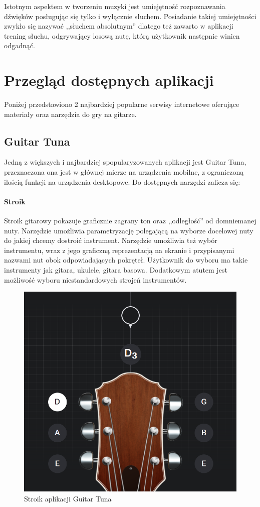Istotnym aspektem w tworzeniu muzyki jest umiejętność rozpoznawania dźwięków posługując się tylko i wyłącznie słuchem. Posiadanie takiej umiejętności zwykło się nazywać ,,słuchem absolutnym'' dlatego też zawarto w aplikacji trening słuchu, odgrywający losową nutę, którą użytkownik następnie winien odgadnąć.  

\section{Przegląd dostępnych aplikacji}
Poniżej przedstawiono 2 najbardziej popularne serwisy internetowe oferujące materiały oraz narzędzia do gry na gitarze. 

\subsection{Guitar Tuna}

Jedną z większych i najbardziej spopularyzowanych aplikacji jest Guitar Tuna, przeznaczona ona jest w głównej mierze na urządzenia mobilne, z ograniczoną ilością funkcji na urządzenia desktopowe. Do dostępnych narzędzi zalicza się:

\paragraph{Stroik}


Stroik gitarowy pokazuje graficznie zagrany ton oraz ,,odległość'' od domniemanej nuty. Narzędzie umożliwia parametryzację polegającą na wyborze docelowej nuty do jakiej chcemy dostroić instrument. Narzędzie umożliwia też wybór instrumentu, wraz z jego graficzną reprezentacją na ekranie i przypisanymi nazwami nut obok odpowiadających pokręteł. Użytkownik do wyboru ma takie instrumenty jak gitara, ukulele, gitara basowa. Dodatkowym atutem jest możliwość wyboru niestandardowych strojeń instrumentów. 

\begin{figure}[htb]
	\centering
	\includegraphics[width=.4\linewidth]{rys02/GTSTROIK}
	\caption{Stroik aplikacji Guitar Tuna} \label{fig:pageLayout}
\end{figure}

